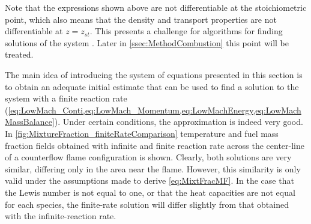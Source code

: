 Note that the expressions shown above are not differentiable at the stoichiometric point, which also means that the density and transport properties are not differentiable at $z =z_{st}$. This presents a challenge for algorithms for finding solutions of the system \citep{rauwoensConservativeDiscreteCompatibilityconstraint2009}. Later in \cref{ssec:MethodCombustion} this point will be treated.

The main idea of introducing the system of equations presented in this section is to obtain an adequate initial estimate that can be used to find a solution to the system with a finite reaction rate (\cref{eq:LowMach_Conti,eq:LowMach_Momentum,eq:LowMachEnergy,eq:LowMachMassBalance}). Under certain conditions, the approximation is indeed very good. In \cref{fig:MixtureFraction_finiteRateComparison} temperature and fuel mass fraction fields obtained with infinite and finite reaction rate across the center-line of a counterflow flame configuration is shown. Clearly, both solutions are very similar, differing only in the area near the flame. However, this similarity is only valid under the assumptions made to derive \cref{eq:MixtFracMF}. In the case that the Lewis number is not equal to one, or that the heat capacities are not equal for each species, the finite-rate solution will differ slightly from that obtained with the infinite-reaction rate.

